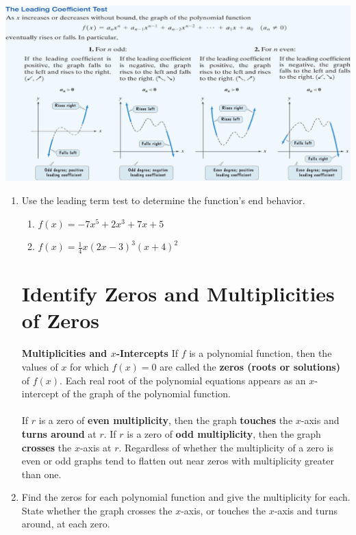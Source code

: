\documentclass[11pt]{article}
\newcommand{\boxcolor}{gray!30}
\newenvironment{boxthm}{\begin{mdframed}[backgroundcolor=\boxcolor,nobreak=true]}{\end{mdframed}}
\begin{document}
\includegraphics[scale=.95]{poly1}
\begin{enumerate}

\item Use the leading term test to determine the function's end behavior.


\begin{enumerate}
\item $f(x)=-7x^5+2x^3+7x+5$
\vfill

\item $f(x)=\frac{1}{4}x(2x-3)^3(x+4)^2$
\vfill
\vfill
\end{enumerate}

\section{Identify Zeros and Multiplicities of Zeros}
\begin{boxthm}
{\bf Multiplicities and $x$-Intercepts}
If $f$ is a polynomial function, then the values of $x$ for which $f(x)=0$ are called the \textbf{zeros (roots or solutions)} of $f(x)$.  Each real root of the polynomial equations appears as an $x$-intercept of the graph of the polynomial function.\\
\\
If $r$ is a zero of \textbf{even multiplicity}, then the graph \textbf{touches} the $x$-axis and \textbf{turns around} at $r$.  If $r$ is a zero of \textbf{odd multiplicity}, then the graph \textbf{crosses} the $x$-axis at $r$.  Regardless of whether the multiplicity of a zero is even or odd graphs tend to flatten out near zeros with multiplicity greater than one.
\end{boxthm}
\newpage



\item Find the zeros for each polynomial function and give the multiplicity for each.  State whether the graph crosses the $x$-axis, or touches the $x$-axis and turns around, at each zero.


\end{enumerate}
\end{document}
